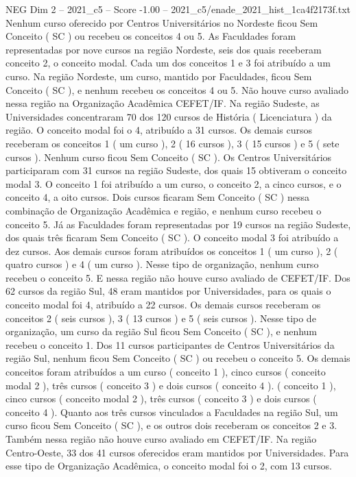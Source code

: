 \begin{textsample}{NEG Dim 2 – 2021\_c5 – Score -1.00 – 2021\_c5/enade\_2021\_hist\_1ca4f2173f.txt}
Nenhum curso oferecido por Centros Universitários no Nordeste ficou Sem Conceito ( SC ) ou recebeu os conceitos 4 ou 5.
As Faculdades foram representadas por nove cursos na região Nordeste, seis dos quais receberam conceito 2, o conceito modal.
Cada um dos conceitos 1 e 3 foi atribuído a um curso.
Na região Nordeste, um curso, mantido por Faculdades, ficou Sem Conceito ( SC ), e nenhum recebeu os conceitos 4 ou 5.
Não houve curso avaliado nessa região na Organização Acadêmica CEFET/IF.
Na região Sudeste, as Universidades concentraram 70 dos 120 cursos de História ( Licenciatura ) da região.
O conceito modal foi o 4, atribuído a 31 cursos.
Os demais cursos receberam os conceitos 1 ( um curso ), 2 ( 16 cursos ), 3 ( 15 cursos ) e 5 ( sete cursos ).
Nenhum curso ficou Sem Conceito ( SC ).
Os Centros Universitários participaram com 31 cursos na região Sudeste, dos quais 15 obtiveram o conceito modal 3.
O conceito 1 foi atribuído a um curso, o conceito 2, a cinco cursos, e o conceito 4, a oito cursos.
Dois cursos ficaram Sem Conceito ( SC ) nessa combinação de Organização Acadêmica e região, e nenhum curso recebeu o conceito 5.
Já as Faculdades foram representadas por 19 cursos na região Sudeste, dos quais três ficaram Sem Conceito ( SC ).
O conceito modal 3 foi atribuído a dez cursos.
Aos demais cursos foram atribuídos os conceitos 1 ( um curso ), 2 ( quatro cursos ) e 4 ( um curso ).
Nesse tipo de organização, nenhum curso recebeu o conceito 5.
E nessa região não houve curso avaliado de CEFET/IF.
Dos 62 cursos da região Sul, 48 eram mantidos por Universidades, para os quais o conceito modal foi 4, atribuído a 22 cursos.
Os demais cursos receberam os conceitos 2 ( seis cursos ), 3 ( 13 cursos ) e 5 ( seis cursos ).
Nesse tipo de organização, um curso da região Sul ficou Sem Conceito ( SC ), e nenhum recebeu o conceito 1.
Dos 11 cursos participantes de Centros Universitários da região Sul, nenhum ficou Sem Conceito ( SC ) ou recebeu o conceito 5.
Os demais conceitos foram atribuídos a um curso ( conceito 1 ), cinco cursos ( conceito modal 2 ), três cursos ( conceito 3 ) e dois cursos ( conceito 4 ). ( conceito 1 ), cinco cursos ( conceito modal 2 ), três cursos ( conceito 3 ) e dois cursos ( conceito 4 ).
Quanto aos três cursos vinculados a Faculdades na região Sul, um curso ficou Sem Conceito ( SC ), e os outros dois receberam os conceitos 2 e 3.
Também nessa região não houve curso avaliado em CEFET/IF.
Na região Centro-Oeste, 33 dos 41 cursos oferecidos eram mantidos por Universidades.
Para esse tipo de Organização Acadêmica, o conceito modal foi o 2, com 13 cursos.

\end{textsample}
